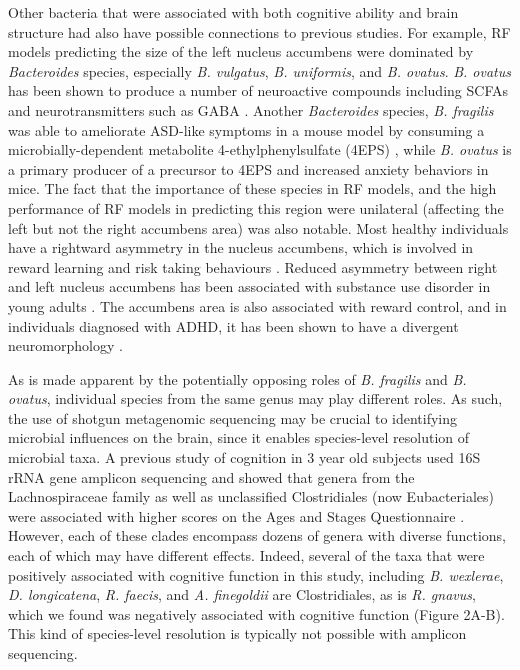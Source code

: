 \documentclass{article}
\begin{document}
Other bacteria that were associated with both cognitive ability and
brain structure had also have possible connections to previous studies.
For example, RF models predicting the size of the left nucleus accumbens
were dominated by \textit{Bacteroides} species,
especially \textit{B. vulgatus}, \textit{B. uniformis}, and \textit{B. ovatus}.
\textit{B. ovatus} has been shown to produce
a number of neuroactive compounds including SCFAs and neurotransmitters
such as GABA \cite{horvathBacteroidesOvatusColonization2022}.
Another \textit{Bacteroides} species, \textit{B. fragilis} was
able to ameliorate ASD-like symptoms in a mouse model
by consuming a microbially-dependent metabolite 4-ethylphenylsulfate (4EPS)
\cite{hsiaoMicrobiotaModulateBehavioral2013},
while \textit{B. ovatus} is a primary producer of a precursor to 4EPS
\cite{needhamGutderivedMetaboliteAlters2022} and increased anxiety
behaviors in mice.
The fact that the importance of these species in RF models,
and the high performance of RF models in predicting this region
were unilateral (affecting the left but not the right accumbens area)
was also notable. Most healthy individuals have a
rightward asymmetry in the nucleus accumbens,
which is involved in reward learning and risk taking behaviours
\cite{ernstAmygdalaNucleusAccumbens2005,yauNucleusAccumbensResponse2012}.
Reduced asymmetry between right and left nucleus accumbens
has been associated with substance use disorder in young adults
\cite{caoMappingCorticalSubcortical2021}. The accumbens area is also
associated with reward control, and in individuals diagnosed with ADHD,
it has been shown to have a divergent neuromorphology
\cite{hoogmanSubcorticalBrainVolume2017}.

As is made apparent by the potentially opposing roles of 
\textit{B. fragilis} and \textit{B. ovatus},
individual species from the same genus may play different roles.
As such, the use of shotgun metagenomic sequencing
may be crucial to identifying microbial influences on the brain,
since it enables species-level resolution of microbial taxa.
A previous study of
cognition in 3 year old subjects used 16S rRNA gene amplicon sequencing
and showed that genera from the Lachnospiraceae family as well as
unclassified Clostridiales (now Eubacteriales) were associated with
higher scores on the Ages and Stages Questionnaire
\cite{sordilloAssociationInfantGut2019}.
However, each of these clades encompass dozens of genera with
diverse functions, each of which may have different effects. Indeed,
several of the taxa that were positively associated with cognitive
function in this study, including \emph{B. wexlerae}, \emph{D.
longicatena}, \emph{R. faecis}, and \emph{A. finegoldii} are
Clostridiales, as is \emph{R. gnavus}, which we found was negatively
associated with cognitive function (Figure 2A-B). This kind of
species-level resolution is typically not possible with amplicon
sequencing.
\end{document}
